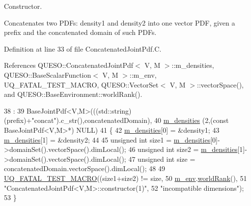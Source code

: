 Constructor. 

Concatenates two P\-D\-Fs\-: {\ttfamily density1} and {\ttfamily density2} into one vector P\-D\-F, given a prefix and the concatenated domain of such P\-D\-Fs. 

Definition at line 33 of file Concatenated\-Joint\-Pdf.\-C.



References Q\-U\-E\-S\-O\-::\-Concatenated\-Joint\-Pdf$<$ V, M $>$\-::m\-\_\-densities, Q\-U\-E\-S\-O\-::\-Base\-Scalar\-Function$<$ V, M $>$\-::m\-\_\-env, U\-Q\-\_\-\-F\-A\-T\-A\-L\-\_\-\-T\-E\-S\-T\-\_\-\-M\-A\-C\-R\-O, Q\-U\-E\-S\-O\-::\-Vector\-Set$<$ V, M $>$\-::vector\-Space(), and Q\-U\-E\-S\-O\-::\-Base\-Environment\-::world\-Rank().


\begin{DoxyCode}
38   :
39   BaseJointPdf<V,M>(((std::string)(prefix)+\textcolor{stringliteral}{"concat"}).c\_str(),concatenatedDomain),
40   \hyperlink{class_q_u_e_s_o_1_1_concatenated_joint_pdf_a42ee130daadf7ceb0d1745011f5b1169}{m\_densities}             (2,(\textcolor{keyword}{const} BaseJointPdf<V,M>*) NULL)
41 \{
42   \hyperlink{class_q_u_e_s_o_1_1_concatenated_joint_pdf_a42ee130daadf7ceb0d1745011f5b1169}{m\_densities}[0] = &density1;
43   \hyperlink{class_q_u_e_s_o_1_1_concatenated_joint_pdf_a42ee130daadf7ceb0d1745011f5b1169}{m\_densities}[1] = &density2;
44 
45   \textcolor{keywordtype}{unsigned} \textcolor{keywordtype}{int} size1 = \hyperlink{class_q_u_e_s_o_1_1_concatenated_joint_pdf_a42ee130daadf7ceb0d1745011f5b1169}{m\_densities}[0]->domainSet().vectorSpace().dimLocal();
46   \textcolor{keywordtype}{unsigned} \textcolor{keywordtype}{int} size2 = \hyperlink{class_q_u_e_s_o_1_1_concatenated_joint_pdf_a42ee130daadf7ceb0d1745011f5b1169}{m\_densities}[1]->domainSet().vectorSpace().dimLocal();
47   \textcolor{keywordtype}{unsigned} \textcolor{keywordtype}{int} size  = concatenatedDomain.vectorSpace().dimLocal();
48 
49   \hyperlink{_defines_8h_a56d63d18d0a6d45757de47fcc06f574d}{UQ\_FATAL\_TEST\_MACRO}((size1+size2) != size,
50                       \hyperlink{class_q_u_e_s_o_1_1_base_scalar_function_adf44141aeb765d97613286f88f235f04}{m\_env}.\hyperlink{class_q_u_e_s_o_1_1_base_environment_a78b57112bbd0e6dd0e8afec00b40ffa7}{worldRank}(),
51                       \textcolor{stringliteral}{"ConcatenatedJointPdf<V,M>::constructor(1)"},
52                       \textcolor{stringliteral}{"incompatible dimensions"});
53 \}
\end{DoxyCode}
